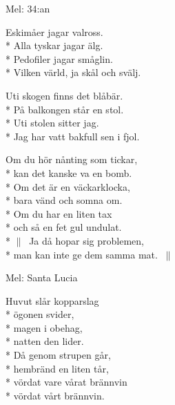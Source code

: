 \begin{SongText}[Bakfyllosofen]
    \begin{SongInfo}
        Mel: 34:an
    \end{SongInfo}
    \begin{SongVerse}
        Eskimåer jagar valross.\\*%
        Alla tyskar jagar älg.\\*%
        Pedofiler jagar småglin.\\*%
        Vilken värld, ja skål och svälj.
    \end{SongVerse}
    \begin{SongVerse}
        Uti skogen finns det blåbär.\\*%
        På balkongen står en stol.\\*%
        Uti stolen sitter jag.\\*%
        Jag har vatt bakfull sen i fjol.
    \end{SongVerse}
    \begin{SongVerse}
        Om du hör nånting som tickar,\\*%
        kan det kanske va en bomb.\\*%
        Om det är en väckarklocka,\\*%
        bara vänd och somna om.\\*%
        Om du har en liten tax\\*%
        och så en fet gul undulat.\\*%
        $\|\:$ Ja då hopar sig problemen,\\*%
        man kan inte ge dem samma mat. $\:\|$
    \end{SongVerse}
\end{SongText}
\begin{SongText}
    \begin{SongInfo}
        Mel: Santa Lucia
    \end{SongInfo}
    \begin{SongVerse}
        Huvut slår kopparslag\\*%
        ögonen svider,\\*%
        magen i obehag,\\*%
        natten den lider.\\*%
        Då genom strupen går,\\*%
        hembränd en liten tår,\\*%
        vördat vare vårat brännvin\\*%
        vördat vårt brännvin.
    \end{SongVerse}
\end{SongText}
